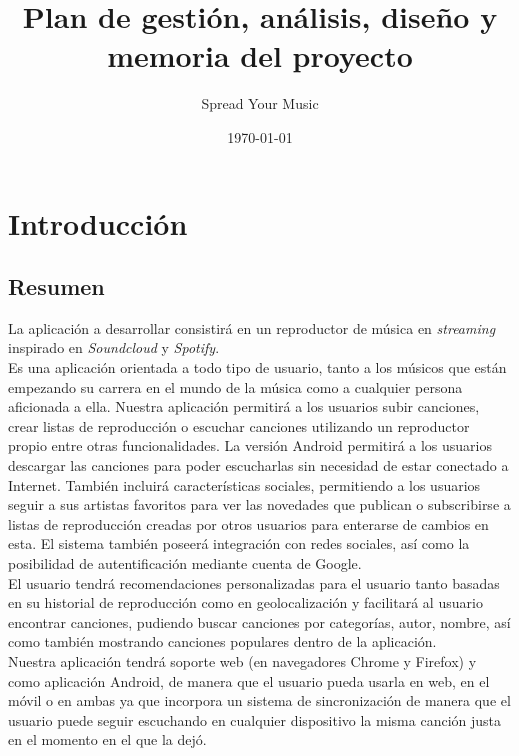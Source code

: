 \documentclass[12pt]{article}%
\begin{document}
\title{Plan de gesti\'on, an\'alisis, dise\~no y memoria del proyecto}
\author{Spread Your Music}
\date{\today}
\maketitle

\tableofcontents

\newpage


\section{Introducci\'on}

\subsection{Resumen}

La aplicaci\'on a desarrollar consistir\'a en un reproductor de m\'usica en \textit{streaming} inspirado en \textit{Soundcloud} y \textit{Spotify}.\\ 

Es una aplicaci\'on orientada a todo tipo de usuario, tanto a los m\'usicos que est\'an empezando su carrera en el mundo de la m\'usica como a cualquier persona aficionada a ella. Nuestra aplicaci\'on permitir\'a a los usuarios subir canciones, crear listas de reproducci\'on o escuchar canciones utilizando un reproductor propio entre otras funcionalidades. La versi\'on Android permitir\'a a los usuarios descargar las canciones para poder escucharlas sin necesidad de estar conectado a Internet. Tambi\'en incluir\'a caracter\'isticas sociales, permitiendo a los usuarios seguir a sus artistas favoritos para ver las novedades que publican o subscribirse a listas de reproducci\'on creadas por otros usuarios para enterarse de cambios en esta. El sistema tambi\'en poseer\'a integraci\'on con redes sociales, as\'i como la posibilidad de autentificaci\'on mediante cuenta de Google.\\

El usuario tendr\'a recomendaciones personalizadas para el usuario tanto basadas en su historial de reproducci\'on como en geolocalizaci\'on y facilitar\'a al usuario encontrar canciones, pudiendo buscar canciones por categor\'ias, autor, nombre, as\'i como tambi\'en mostrando canciones populares dentro de la aplicaci\'on.\\

Nuestra aplicaci\'on tendr\'a soporte web (en navegadores Chrome y Firefox) y como aplicaci\'on Android, de manera que el usuario pueda usarla en web, en el m\'ovil o en ambas ya que incorpora un sistema de sincronizaci\'on de manera que el usuario puede seguir escuchando en cualquier dispositivo la misma canci\'on justa en el momento en el que la dej\'o. \\
\end{document}

